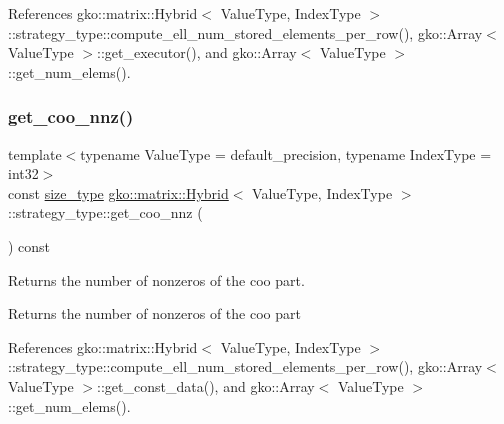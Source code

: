 References gko\+::matrix\+::\+Hybrid$<$ Value\+Type, Index\+Type $>$\+::strategy\+\_\+type\+::compute\+\_\+ell\+\_\+num\+\_\+stored\+\_\+elements\+\_\+per\+\_\+row(), gko\+::\+Array$<$ Value\+Type $>$\+::get\+\_\+executor(), and gko\+::\+Array$<$ Value\+Type $>$\+::get\+\_\+num\+\_\+elems().

\mbox{\label{classgko_1_1matrix_1_1Hybrid_1_1strategy__type_a4eab8283af5bbec83dab7c7f24df32ab}} 
\subsubsection{\texorpdfstring{get\+\_\+coo\+\_\+nnz()}{get\_coo\_nnz()}}
{\footnotesize\ttfamily template$<$typename Value\+Type = default\+\_\+precision, typename Index\+Type = int32$>$ \\
const \hyperlink{namespacegko_a6e5c95df0ae4e47aab2f604a22d98ee7}{size\+\_\+type} \hyperlink{classgko_1_1matrix_1_1Hybrid}{gko\+::matrix\+::\+Hybrid}$<$ Value\+Type, Index\+Type $>$\+::strategy\+\_\+type\+::get\+\_\+coo\+\_\+nnz (\begin{DoxyParamCaption}{ }\end{DoxyParamCaption}) const\hspace{0.3cm}{\ttfamily [noexcept]}}



Returns the number of nonzeros of the coo part. 

\begin{DoxyReturn}{Returns}
the number of nonzeros of the coo part 
\end{DoxyReturn}


References gko\+::matrix\+::\+Hybrid$<$ Value\+Type, Index\+Type $>$\+::strategy\+\_\+type\+::compute\+\_\+ell\+\_\+num\+\_\+stored\+\_\+elements\+\_\+per\+\_\+row(), gko\+::\+Array$<$ Value\+Type $>$\+::get\+\_\+const\+\_\+data(), and gko\+::\+Array$<$ Value\+Type $>$\+::get\+\_\+num\+\_\+elems().

\mbox{\label{classgko_1_1matrix_1_1Hybrid_1_1strategy__type_a3a1bc0e4837a3fde7650455088c3da8a}} 
